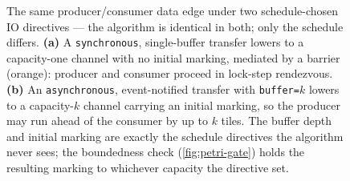 \begin{figure}[tbp]
{}
  \caption[One data edge under two IO directives]{The same producer/consumer data
    edge under two schedule-chosen IO directives --- the algorithm is identical in
    both; only the schedule differs. \textbf{(a)} A \texttt{synchronous},
    single-buffer transfer lowers to a capacity-one channel with no initial
    marking, mediated by a barrier (orange): producer and consumer proceed in
    lock-step rendezvous. \textbf{(b)} An \texttt{asynchronous}, event-notified
    transfer with \texttt{buffer=}$k$ lowers to a capacity-$k$ channel carrying an
    initial marking, so the producer may run ahead of the consumer by up to $k$
    tiles. The buffer depth and initial marking are exactly the schedule
    directives the algorithm never sees; the boundedness check (\cref{fig:petri-gate})
    holds the resulting marking to whichever capacity the directive set.}
  \label{fig:petri-io}
\end{figure}

